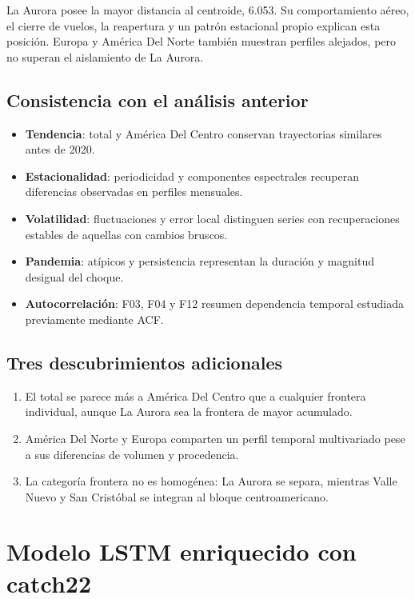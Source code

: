\documentclass[11pt,letterpaper]{article}
\begin{document}
La Aurora posee la mayor distancia al centroide, 6.053. Su comportamiento
aéreo, el cierre de vuelos, la reapertura y un patrón estacional propio
explican esta posición. Europa y América Del Norte también muestran perfiles
alejados, pero no superan el aislamiento de La Aurora.

\subsection{Consistencia con el análisis anterior}

\begin{itemize}
  \item \textbf{Tendencia}: total y América Del Centro conservan trayectorias
  similares antes de 2020.
  \item \textbf{Estacionalidad}: periodicidad y componentes espectrales
  recuperan diferencias observadas en perfiles mensuales.
  \item \textbf{Volatilidad}: fluctuaciones y error local distinguen series
  con recuperaciones estables de aquellas con cambios bruscos.
  \item \textbf{Pandemia}: atípicos y persistencia representan la duración y
  magnitud desigual del choque.
  \item \textbf{Autocorrelación}: F03, F04 y F12 resumen dependencia temporal
  estudiada previamente mediante ACF.
\end{itemize}

\subsection{Tres descubrimientos adicionales}

\begin{enumerate}
  \item El total se parece más a América Del Centro que a cualquier frontera
  individual, aunque La Aurora sea la frontera de mayor acumulado.
  \item América Del Norte y Europa comparten un perfil temporal multivariado
  pese a sus diferencias de volumen y procedencia.
  \item La categoría frontera no es homogénea: La Aurora se separa, mientras
  Valle Nuevo y San Cristóbal se integran al bloque centroamericano.
\end{enumerate}

\section{Modelo LSTM enriquecido con catch22}
\end{document}
